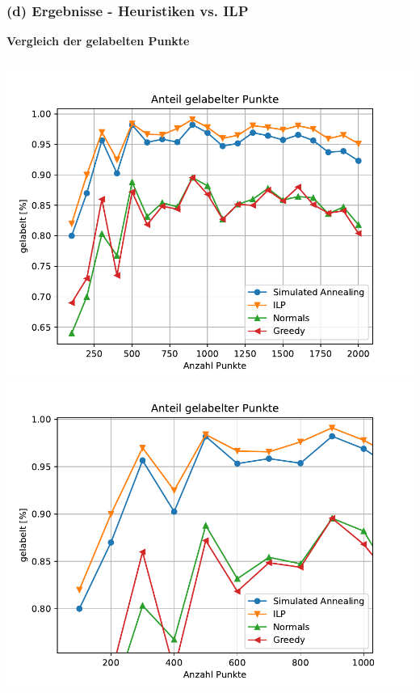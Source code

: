 \documentclass[aspectratio=169]{beamer}
\begin{document}


\begin{frame}
	\frametitle{(d) Ergebnisse - Heuristiken vs. ILP}
	\textbf{Vergleich der gelabelten Punkte}
	\begin{columns}[c] %
	
	
	\includegraphics[scale=.45]{gelabelt_all.pdf}
	\includegraphics[scale=.45]{gelabelt_detail.pdf}
	

	\end{columns}

	\end{frame}
\end{document}
